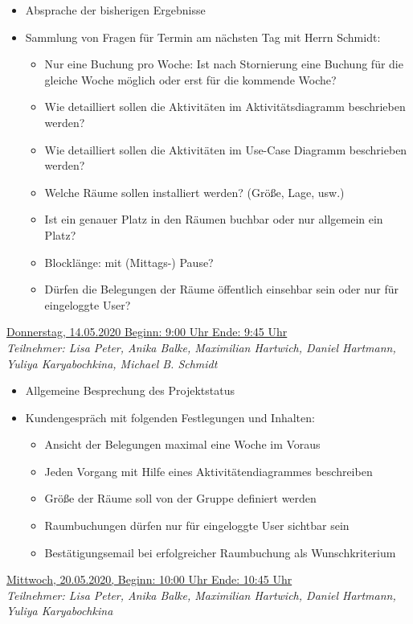 \documentclass[a4paper,report,headsepline]{scrreprt}
\begin{document}
\begin{itemize}
 \item Absprache der bisherigen Ergebnisse
\item Sammlung von Fragen für Termin am nächsten Tag mit Herrn Schmidt:
\begin{itemize}
 \item Nur eine Buchung pro Woche: Ist nach Stornierung eine Buchung für die gleiche Woche möglich oder erst für die kommende Woche?
\item Wie detailliert sollen die Aktivitäten im Aktivitätsdiagramm beschrieben werden?
\item Wie detailliert sollen die Aktivitäten im Use-Case Diagramm beschrieben werden?
\item Welche Räume sollen installiert werden? (Größe, Lage, usw.)
\item Ist ein genauer Platz in den Räumen buchbar oder nur allgemein ein Platz?
\item Blocklänge: mit (Mittags-) Pause?
\item Dürfen die Belegungen der Räume öffentlich einsehbar sein oder nur für eingeloggte User? 

\end{itemize} 
\end{itemize}  
 \underline{{\large Donnerstag, 14.05.2020 Beginn: 9:00 Uhr Ende: 9:45 Uhr}}  \\
\textit{Teilnehmer: Lisa Peter, Anika Balke, Maximilian Hartwich, Daniel Hartmann, Yuliya Karyabochkina, Michael B. Schmidt}

\begin{itemize}
\item Allgemeine Besprechung des Projektstatus
\item Kundengespräch mit folgenden Festlegungen und Inhalten: 
\begin{itemize}
\item Ansicht der Belegungen maximal eine Woche im Voraus
\item Jeden Vorgang mit Hilfe eines Aktivitätendiagrammes beschreiben
\item Größe der Räume soll von der Gruppe definiert werden
\item Raumbuchungen dürfen nur für eingeloggte User sichtbar sein
\item Bestätigungsemail bei erfolgreicher Raumbuchung als Wunschkriterium

\end{itemize} 
\end{itemize}
 \underline{{\large Mittwoch, 20.05.2020, Beginn: 10:00 Uhr Ende: 10:45 Uhr}}  \\
\textit{Teilnehmer: Lisa Peter, Anika Balke, Maximilian Hartwich, Daniel Hartmann, Yuliya Karyabochkina}
\end{document}
